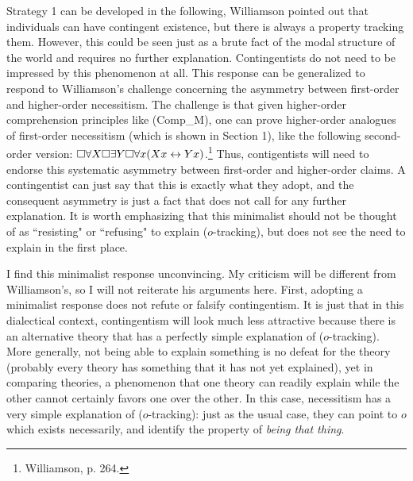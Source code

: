 Strategy 1 can be developed in the following, Williamson pointed out that individuals can have contingent existence, but there is always a property tracking them. However, this could be seen just as a brute fact of the modal structure of the world and requires no further explanation. Contingentists do not need to be impressed by this phenomenon at all. This response can be generalized to respond to Williamson's challenge concerning the asymmetry between first-order and higher-order necessitism. The challenge is that given higher-order comprehension principles like (Comp_M), one can prove higher-order analogues of first-order necessitism (which is shown in Section 1), like the following second-order version: $\Box \forall X \Box \exists Y \Box \forall x (Xx \leftrightarrow Yx)$.\footnote{Williamson, p. 264.} Thus, contigentists will need to endorse this systematic asymmetry between first-order and higher-order claims.  
A contingentist can just say that this is exactly what they adopt, and the consequent asymmetry is just a fact that does not call for any further explanation. It is worth emphasizing that this minimalist should not be thought of as ``resisting" or ``refusing" to explain ($o$-tracking), but does not see the need to explain in the first place. 

I find this minimalist response unconvincing. My criticism will be different from Williamson's, so I will not reiterate his arguments here.
First, adopting a minimalist response does not refute or falsify contingentism. It is just that in this dialectical context, contingentism will look much less attractive because there is an alternative theory that has a perfectly simple explanation of ($o$-tracking). More generally, not being able to explain something is no defeat for the theory (probably every theory has something that it has not yet explained), yet in comparing theories, a phenomenon that one theory can readily explain while the other cannot certainly favors one over the other. In this case, necessitism has a very simple explanation of ($o$-tracking): just as the usual case, they can point to $o$ which exists necessarily, and identify the property of \emph{being that thing}. 

